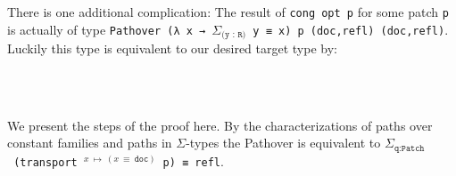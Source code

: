 There is one additional complication: The result of \texttt{cong opt p} for some patch \texttt{p}
is actually of type \texttt{Pathover (λ x → $\Sigma_\texttt{(y : R)}$ y ≡ x) p (doc,refl) (doc,refl)}.
Luckily this type is equivalent to our desired target type by:
\begin{code}%
\>[0]\AgdaSpace{}%
\AgdaSymbol{:}%
\>[958I]\AgdaSymbol{\{}\AgdaSpace{}%
\AgdaSymbol{:}\AgdaSpace{}%
\AgdaSymbol{\}}\AgdaSpace{}%
\<%
\\
\>[.][@{}l@{}]\<[958I]%
\>[4]\AgdaSymbol{(}\AgdaSpace{}%
\AgdaSpace{}%
\AgdaSpace{}%
\AgdaSpace{}%
\AgdaFunction{Σ[}\AgdaSpace{}%
\AgdaSpace{}%
\AgdaSpace{}%
\AgdaSpace{}%
\AgdaFunction{]}\AgdaSpace{}%
\AgdaSpace{}%
\AgdaSpace{}%
\AgdaSpace{}%
\AgdaSymbol{)}\AgdaSpace{}%
\AgdaSymbol{(}\AgdaSpace{}%
\AgdaOperator{\AgdaInductiveConstructor{,}}\AgdaSpace{}%
\AgdaSymbol{)}\AgdaSpace{}%
\AgdaSymbol{(}\AgdaSpace{}%
\AgdaOperator{\AgdaInductiveConstructor{,}}\AgdaSpace{}%
\AgdaSymbol{))}\<%
\\
%
\>[4]\AgdaSpace{}%
\AgdaSymbol{(}\AgdaFunction{Σ[}\AgdaSpace{}%
\AgdaSpace{}%
\AgdaSpace{}%
\AgdaSpace{}%
\AgdaFunction{]}\AgdaSpace{}%
\AgdaSpace{}%
\AgdaSpace{}%
\AgdaSymbol{)}\<%
\end{code}
\begin{code}[hide]%
\>[0]%
\>[988I]\AgdaSymbol{\{}\AgdaSymbol{\}}\AgdaSpace{}%
\AgdaSymbol{=}\<%
\end{code}
We present the steps of the proof here.
By the characterizations of paths over constant families and paths in $\Sigma$-types the Pathover
is equivalent to
\texttt{$\Sigma_\texttt{q:Patch}$~(transport~$^{x~\mapsto~(x~≡~\texttt{doc})}$~p)~≡~refl}.
